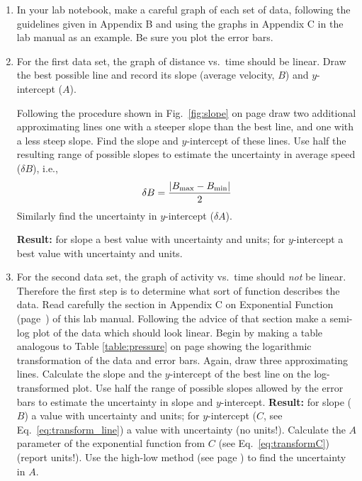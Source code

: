 \begin{enumerate}
\item In your lab notebook, make a careful graph of each set of
        data, following the guidelines given in
        Appendix B  and using the graphs in
        Appendix C  in the lab
        manual as an example.  Be sure
        you plot the error bars.
\item For the first data set, the graph  of distance vs.\ time
        should be linear.  Draw the best possible line and record
its slope (average velocity, $B$) and $y$-intercept ($A$).

Following the procedure shown in Fig.~\ref{fig:slope} on
page \pageref{fig:slope} draw two additional approximating lines
one with a steeper slope than the best line, and one with a less
steep slope. Find the slope and $y$-intercept of these lines.
Use half the resulting range of
possible slopes to estimate the
uncertainty in average speed ($\delta B$), i.e.,
\[
\delta B = {|B_{\rm max} -B_{\rm min}|\over 2}
\]
Similarly find the
uncertainty in $y$-intercept ($\delta A$).

{\bf Result:} for slope a best value with uncertainty and units; for $y$-intercept
 a best value with uncertainty and units.
\item For the second data set, the graph of activity vs.\ time
        should {\em not} be linear.  Therefore the first step is to
        determine what sort of function describes the data.  Read
        carefully the section in Appendix C on Exponential Function
        (page~\pageref{exprel}) of this lab manual.  Following
        the advice of that section make a semi-log plot of the
        data which should look linear.  Begin by making a table analogous to 
Table \ref{table:pressure} on page
\pageref{table:pressure} showing the logarithmic transformation of the data and error
bars. Again, draw three approximating lines.
Calculate the slope and the $y$-intercept of the best line on the log-transformed plot.
Use half the range of
        possible slopes allowed by the error bars to estimate the
        uncertainty in slope
and $y$-intercept. %
{\bf Result:} for slope ($B$) a value with uncertainty and units; for $y$-intercept
($C$, see Eq.~\ref{eq:transform_line}) a value with uncertainty (no units!).
Calculate the $A$ parameter of the exponential function from $C$ (see Eq.~\ref{eq:transformC}) (report units!).
Use the high-low method (see page \pageref{par:high.low.game}) to find
the uncertainty in $A$.



\end{enumerate}

